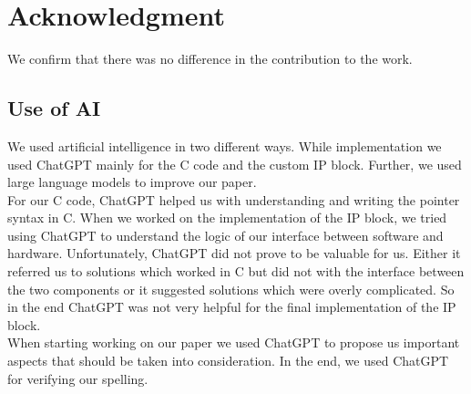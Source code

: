 \documentclass[conference]{IEEEtran}
\begin{document}
\section*{Acknowledgment}

We confirm that there was no difference in the contribution to the work.

\printbibliography

\begin{appendices}
\section{Use of AI}
We used artificial intelligence in two different ways. While implementation we used ChatGPT mainly for the C code and the custom IP block. Further, we used large language models to improve our paper.\\
For our C code, ChatGPT helped us with understanding and writing the pointer syntax in C. When we worked on the implementation of the IP block, we tried using ChatGPT to understand the logic of our interface between software and hardware. Unfortunately, ChatGPT did not prove to be valuable for us. Either it referred us to solutions which worked in C but did not with the interface between the two components or it suggested solutions which were overly complicated. So in the end ChatGPT was not very helpful for the final implementation of the IP block.\\
When starting working on our paper we used ChatGPT to propose us important aspects that should be taken into consideration. In the end, we used ChatGPT for verifying our spelling.
\end{appendices}
\end{document}
